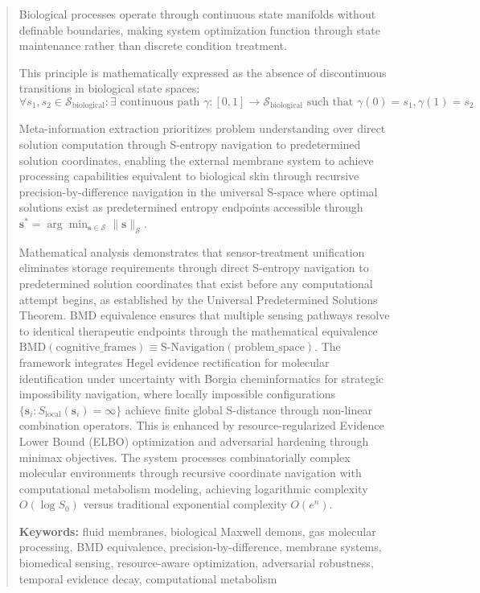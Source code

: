 \documentclass[12pt,a4paper]{article}
\begin{document}
\begin{abstract}
\begin{principle}
Biological processes operate through continuous state manifolds without definable boundaries, making system optimization function through state maintenance rather than discrete condition treatment.
\end{principle}

This principle is mathematically expressed as the absence of discontinuous transitions in biological state spaces:
\begin{equation}
\forall s_1, s_2 \in \mathcal{S}_{\text{biological}}: \exists \text{ continuous path } \gamma: [0,1] \to \mathcal{S}_{\text{biological}} \text{ such that } \gamma(0) = s_1, \gamma(1) = s_2
\end{equation}

Meta-information extraction prioritizes problem understanding over direct solution computation through S-entropy navigation to predetermined solution coordinates, enabling the external membrane system to achieve processing capabilities equivalent to biological skin through recursive precision-by-difference navigation in the universal S-space where optimal solutions exist as predetermined entropy endpoints accessible through $\mathbf{s}^* = \arg\min_{\mathbf{s} \in \mathcal{S}} \|\mathbf{s}\|_{\mathcal{S}}$.

Mathematical analysis demonstrates that sensor-treatment unification eliminates storage requirements through direct S-entropy navigation to predetermined solution coordinates that exist before any computational attempt begins, as established by the Universal Predetermined Solutions Theorem. BMD equivalence ensures that multiple sensing pathways resolve to identical therapeutic endpoints through the mathematical equivalence $\text{BMD}(\text{cognitive\_frames}) \equiv \text{S-Navigation}(\text{problem\_space})$. The framework integrates Hegel evidence rectification for molecular identification under uncertainty with Borgia cheminformatics for strategic impossibility navigation, where locally impossible configurations $\{\mathbf{s}_i : S_{\text{local}}(\mathbf{s}_i) = \infty\}$ achieve finite global S-distance through non-linear combination operators. This is enhanced by resource-regularized Evidence Lower Bound (ELBO) optimization and adversarial hardening through minimax objectives. The system processes combinatorially complex molecular environments through recursive coordinate navigation with computational metabolism modeling, achieving logarithmic complexity $O(\log S_0)$ versus traditional exponential complexity $O(e^n)$.

\textbf{Keywords:} fluid membranes, biological Maxwell demons, gas molecular processing, BMD equivalence, precision-by-difference, membrane systems, biomedical sensing, resource-aware optimization, adversarial robustness, temporal evidence decay, computational metabolism
\end{abstract}
\end{document}
